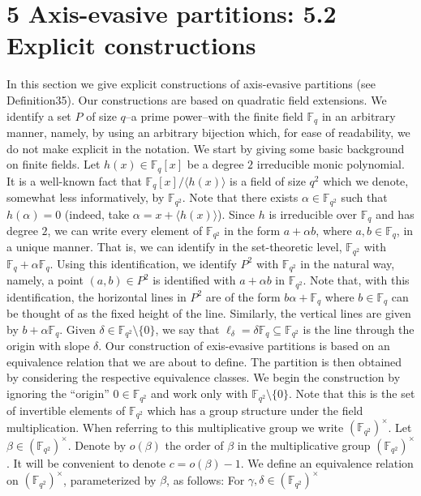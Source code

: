 \documentclass[10pt,a4paper]{article}
\begin{document}
\section*{5 Axis-evasive partitions: 5.2 Explicit constructions}
In this section we give explicit constructions of axis-evasive partitions (see Definition35). Our constructions are based on quadratic field extensions. We identify a set $P$ of size $q$--a prime power--with the finite field $\mathbb F_q$ in an arbitrary manner, namely, by using an arbitrary bijection which, for ease of readability, we do not make explicit in the notation. We start by giving some basic background on finite fields.
Let $h(x)\in\mathbb F_q[x]$ be a degree $2$ irreducible monic polynomial. It is a well-known fact that $\mathbb F_q[x]/\langle h(x)\rangle$ is a field of size $q^2$ which we denote, somewhat less informatively, by $\mathbb F_{q^2}$. Note that there exists $\alpha\in\mathbb F_{q^2}$ such that $h(\alpha)=0$ (indeed, take $\alpha=x+\langle h(x)\rangle$). Since $h$ is irreducible over $\mathbb F_q$ and has degree $2$, we can write every element of $\mathbb F_{q^2}$ in the form $a+\alpha b$, where $a,b\in\mathbb F_q$, in a unique manner. That is, we can identify in the set-theoretic level, $\mathbb F_{q^2}$ with $\mathbb F_q+\alpha\mathbb F_q$. Using this identification, we identify $P^2$ with $\mathbb F_{q^2}$ in the natural way, namely, a point $(a,b)\in P^2$ is identified with $a+\alpha b$ in $\mathbb F_{q^2}$. Note that, with this identification, the horizontal lines in $P^2$ are of the form $b\alpha+\mathbb F_q$ where $b\in\mathbb F_q$ can be thought of as the fixed height of the line. Similarly, the vertical lines are given by $b+\alpha\mathbb F_q$. Given $\delta\in\mathbb F_{q^2}\setminus\{0\}$, we say that $\ell_\delta=\delta\mathbb F_q\subseteq\mathbb F_{q^2}$ is the line through the origin with slope $\delta$.
Our construction of exis-evasive partitions is based on an equivalence relation that we are about to define. The partition is then obtained by considering the respective equivalence classes. We begin the construction by ignoring the ``origin'' $0\in\mathbb F_{q^2}$ and work only with $\mathbb F_{q^2}\setminus\{0\}$. Note that this is the set of invertible elements of $\mathbb F_{q^2}$ which has a group structure under the field multiplication. When referring to this multiplicative group we write $(\mathbb F_{q^2})^\times$.
Let $\beta\in(\mathbb F_{q^2})^\times$. Denote by $o(\beta)$ the order of $\beta$ in the multiplicative group $(\mathbb F_{q^2})^\times$. It will be convenient to denote $c=o(\beta)-1$. We define an equivalence relation on $(\mathbb F_{q^2})^\times$, parameterized by $\beta$, as follows: For $\gamma,\delta\in(\mathbb F_{q^2})^\times$
\end{document}
